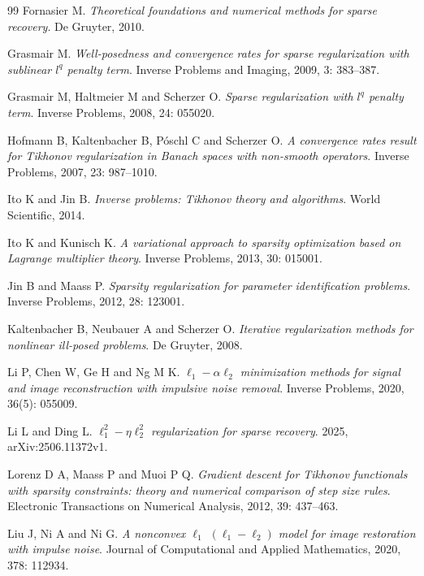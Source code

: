 \documentclass[a4paper,12pt]{article}
\numberwithin{equation}{section}
\begin{document}
\begin{thebibliography}{99}
Fornasier M. \emph{Theoretical foundations and numerical methods for sparse recovery}. De Gruyter, 2010.

Grasmair M. \emph{Well-posedness and convergence rates for sparse regularization with sublinear $l^q$ penalty term}. Inverse Problems and Imaging, 2009, 3: 383--387. 

Grasmair M, Haltmeier M and Scherzer O. \emph{Sparse regularization with $l^q$ penalty term}. Inverse Problems, 2008, 24: 055020.

Hofmann B, Kaltenbacher B, P\'{o}schl C and Scherzer O. \emph{A convergence rates result for Tikhonov regularization in Banach spaces with non-smooth operators}. Inverse Problems, 2007, 23: 987--1010.

Ito K and Jin B. \emph{Inverse problems: Tikhonov theory and algorithms}. World Scientific, 2014.

Ito K and Kunisch K. \emph{A variational approach to sparsity optimization based on Lagrange multiplier theory}. Inverse Problems, 2013, 30: 015001.

Jin B and Maass P. \emph{Sparsity regularization for parameter identification problems}. Inverse Problems, 2012, 28: 123001.


Kaltenbacher B, Neubauer A and Scherzer O. \emph{Iterative regularization methods for nonlinear ill-posed problems}. De Gruyter, 2008.

Li P, Chen W, Ge H and Ng M K. \emph{$\ell_{1}-\alpha\ell_{2}$ minimization methods for signal and image reconstruction with impulsive noise removal}. Inverse Problems, 2020, 36(5): 055009.

Li L and Ding L. \emph{$\ell_{1}^{2}-\eta\ell_{2}^{2}$ regularization for sparse recovery}. 2025, arXiv:2506.11372v1.

Lorenz D A, Maass P and Muoi P Q. \emph{Gradient descent for Tikhonov functionals with sparsity constraints: theory and numerical comparison of step size rules}. Electronic Transactions on Numerical Analysis, 2012, 39: 437--463.

Liu J, Ni A and Ni G. \emph{A nonconvex $\ell_{1}$ $\left(\ell_{1}-\ell_{2}\right)$ model for image restoration with impulse noise}. Journal of Computational and Applied Mathematics, 2020, 378: 112934.


\end{thebibliography}
\end{document}
